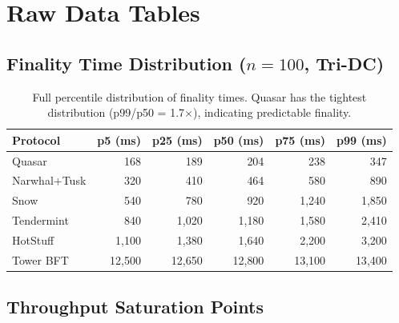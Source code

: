 \documentclass[11pt]{article}
\begin{document}

\appendix

\section{Raw Data Tables}
\label{app:raw}

\subsection{Finality Time Distribution ($n=100$, Tri-DC)}

\begin{table}[h]
\centering
\small
\begin{tabular}{@{}lrrrrr@{}}
\toprule
\textbf{Protocol} & \textbf{p5 (ms)} & \textbf{p25 (ms)} & \textbf{p50 (ms)} & \textbf{p75 (ms)} & \textbf{p99 (ms)} \\
\midrule
Quasar        & 168   & 189   & 204   & 238   & 347 \\
Narwhal+Tusk  & 320   & 410   & 464   & 580   & 890 \\
Snow          & 540   & 780   & 920   & 1{,}240 & 1{,}850 \\
Tendermint    & 840   & 1{,}020 & 1{,}180 & 1{,}580 & 2{,}410 \\
HotStuff      & 1{,}100 & 1{,}380 & 1{,}640 & 2{,}200 & 3{,}200 \\
Tower BFT     & 12{,}500 & 12{,}650 & 12{,}800 & 13{,}100 & 13{,}400 \\
\bottomrule
\end{tabular}
\caption{Full percentile distribution of finality times. Quasar has the tightest
distribution (p99/p50 = 1.7$\times$), indicating predictable finality.}
\label{tab:finality-raw}
\end{table}

\subsection{Throughput Saturation Points}
\end{document}
